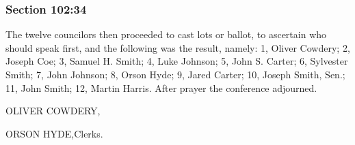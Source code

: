 	\subsubsection{Section 102:34} %
		\label{DC102-34}

		The twelve councilors then proceeded to cast lots or ballot, to ascertain who should speak first, and the following was the result, namely: 1, Oliver Cowdery; 2, Joseph Coe; 3, Samuel H. Smith; 4, Luke Johnson; 5, John S.  Carter; 6, Sylvester Smith; 7, John Johnson; 8, Orson Hyde; 9, Jared Carter; 10, Joseph Smith, Sen.; 11, John Smith; 12, Martin Harris.  After prayer the conference adjourned.
		
		OLIVER COWDERY,
		
		ORSON HYDE,Clerks.

